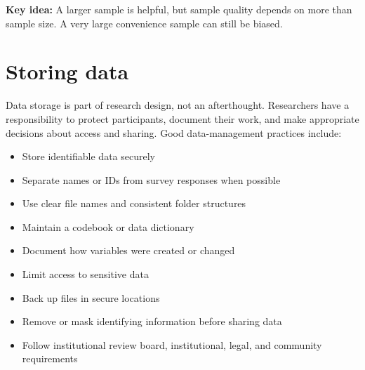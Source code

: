 \documentclass[
  letterpaper,
  DIV=11,
  numbers=noendperiod]{scrartcl}
\providecommand{\tightlist}{%
  \setlength{\itemsep}{0pt}\setlength{\parskip}{0pt}}\usepackage{longtable,booktabs,array}
\begin{document}
\textbf{Key idea:} A larger sample is helpful, but sample quality
depends on more than sample size. A very large convenience sample can
still be biased.

\section{Storing data}\label{storing-data}

Data storage is part of research design, not an afterthought.
Researchers have a responsibility to protect participants, document
their work, and make appropriate decisions about access and sharing.
Good data-management practices include:

\begin{itemize}
\tightlist
\item
  Store identifiable data securely
\item
  Separate names or IDs from survey responses when possible
\item
  Use clear file names and consistent folder structures
\item
  Maintain a codebook or data dictionary
\item
  Document how variables were created or changed
\item
  Limit access to sensitive data
\item
  Back up files in secure locations
\item
  Remove or mask identifying information before sharing data
\item
  Follow institutional review board, institutional, legal, and community
  requirements
\end{itemize}
\end{document}
